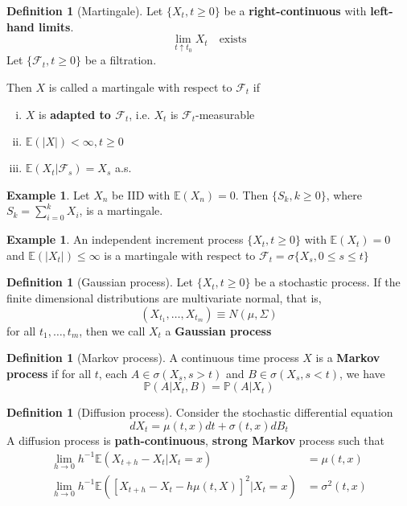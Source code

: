 \documentclass[10pt, oneside, reqno]{amsart}
\theoremstyle{plain}%
\theoremstyle{definition}
\newtheorem{defn}[thm]{Definition}
\newtheorem{exmp}[thm]{Example}
\theoremstyle{remark}
\renewcommand{\P}{\mathbb{P}}
\newcommand{\E}{\mathbb{E}}
\newcommand{\sigf}{\mathcal{F}}
\begin{document}
\begin{defn}[Martingale]
	Let $\{ X_t, t \geq 0 \}$ be a \textbf{right-continuous} with \textbf{left-hand limits}.  \[
		\lim_{t \uparrow t_0} X_t \quad \text{exists}
	\]
	Let $\{\sigf_t, t \geq 0 \} $ be a filtration.  
	
	Then $X$ is called a martingale with respect to $\sigf_t$ if 
	\begin{enumerate}[(i)]
		\item $X$ is \textbf{adapted to $\sigf_t$}, i.e. $X_t$ is $\sigf_t$-measurable
		\item $\E(|X|) < \infty, t \geq 0$
		\item $\E(X_t | \sigf_s) = X_s$ a.s.
	\end{enumerate}
\end{defn}

\begin{exmp}
	Let $X_n$ be IID with $\E(X_n) = 0$.  Then $\{ S_k, k \geq 0 \}$, where $S_k = \sum_{i = 0}^k X_i$, is a martingale.
\end{exmp}

\begin{exmp}
	An independent increment process $\{ X_t, t \geq 0 \}$ with $\E(X_t) = 0$ and $\E(|X_t|) \leq \infty$ is a martingale with respect to $\sigf_t = \sigma\{ X_s, 0 \leq s \leq t \}$
\end{exmp}

\begin{defn}[Gaussian process]
	Let $\{ X_t, t \geq 0 \}$ be a stochastic process.  If the finite dimensional distributions are multivariate normal, that is,\[
		(X_{t_1}, \dots, X_{t_m}) \equiv N(\mu, \Sigma)
	\]
	for all $t_1, \dots, t_m$, then we call $X_t$ a \textbf{Gaussian process}
\end{defn}

\begin{defn}[Markov process]
	A continuous time process $X$ is a \textbf{Markov process} if for all $t$, each $A \in \sigma( X_s, s > t)$ and $B \in \sigma( X_s, s < t)$, we have \[
		\P(A|X_t, B) = \P(A | X_t)
	\]
\end{defn}

\begin{defn}[Diffusion process]
	Consider the stochastic differential equation \[
	dX_t = \mu(t, x) dt + \sigma(t,x) dB_t
	\]
	A diffusion process is \textbf{path-continuous}, \textbf{strong Markov} process such that
	\begin{align*}
		\lim_{h \rightarrow 0} h^{-1} \E( X_{t+h} - X_t | X_t = x) &= \mu(t, x)	\\
		\lim_{h \rightarrow 0} h^{-1} \E([X_{t+h} - X_t - h\mu(t, X)]^2 | X_t = x) &= \sigma^2(t, x)
	\end{align*}

\end{defn}
\end{document}
